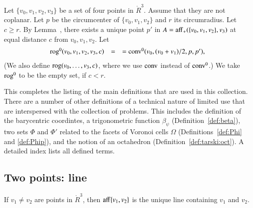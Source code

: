 \begin{tarskidata}
\begin{tarski}
\begin{definition} 
Let $\{v_0,v_1,v_2,v_3\}$ be a set of four points in $\ring{R}^3$.
Assume that they are not coplanar.  Let $p$ be the circumcenter
of $\{v_0,v_1,v_2\}$ and $r$ its circumradius.  Let $c\ge r$.
By Lemma~, there exists a unique
point $p'$ in $A={\operatorname{aff}}_+(\{v_0,v_1,v_2\},v_3)$ at equal distance $c$
from $v_0,v_1,v_2$.
Let $$
    \begin{array}{rll}
    {\operatorname{rog}}^0(v_0,v_1,v_2,v_3,c) &= 
    &= {\operatorname{conv}}^0(v_0,(v_0+v_1)/2,p,p'),\\
    \end{array}
    $$
(We also define ${\operatorname{rog}}(v_0,\ldots,v_3,c)$, where we use
${\operatorname{conv}}$ instead of ${\operatorname{conv}}^0$.)
We take ${\operatorname{rog}}^0$ to be the empty set, if $c< r$.
\end{definition}
This completes the listing of the main definitions that
are used in this collection.  There are a number of other
definitions of a technical nature of limited use that
are interspersed with the collection of problems.
This includes the definition of the barycentric coordintes,
a trigonometric function $\beta_\psi$ (Definition~\ref{def:beta}),
two sets $\Phi$ and $\Phi'$ related to the
facets of Voronoi cells $\Omega$ (Definitions~\ref{def:Phi}
and \ref{def:Phip}), and the notion of an octahedron
(Definition~\ref{def:tarski:oct}).  A detailed index lists
all defined terms.
\end{tarski}










\begin{tarski}
\section{Two points: line}

\begin{lemma}
	If $v_1\ne v_2$ are points in $\ring{R}^3$, then ${\operatorname{aff}}\{v_1,v_2\}$ is the unique
line containing $v_1$ and $v_2$.
\end{lemma}


\end{tarski}
\end{tarskidata}
